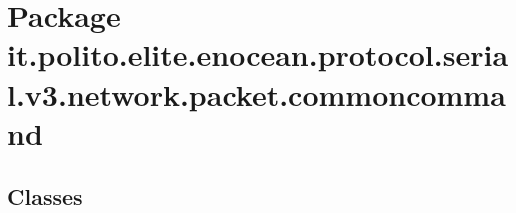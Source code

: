 \hypertarget{namespaceit_1_1polito_1_1elite_1_1enocean_1_1protocol_1_1serial_1_1v3_1_1network_1_1packet_1_1commoncommand}{}\section{Package it.\+polito.\+elite.\+enocean.\+protocol.\+serial.\+v3.\+network.\+packet.\+commoncommand}
\label{namespaceit_1_1polito_1_1elite_1_1enocean_1_1protocol_1_1serial_1_1v3_1_1network_1_1packet_1_1commoncommand}
\subsection*{Classes}
